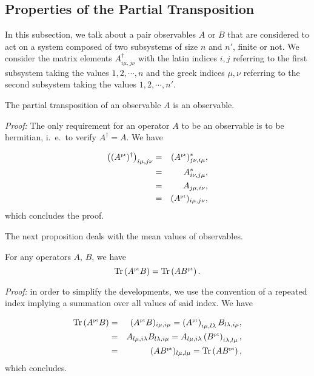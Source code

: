 \subsection{Properties of the Partial Transposition}

In this subsection, we talk about a pair observables $A$ or $B$ that are considered to act on a system composed of two subsystems of size $n$ and $n'$, finite or not. We consider the matrix elements $A^\dagger_{i\mu,j\nu}$ with the latin indices $i,j$ referring to the first subsystem taking the values $1,2,\cdots,n$ and the greek indices $\mu,\nu$ referring to the second subsystem taking the values $1,2,\cdots,n'$.

\setcounter{prop}{0}

\begin{prop} \label{prop-herm}
  The partial transposition of an observable $A$ is an observable.
\end{prop}

\emph{Proof: } The only requirement for an operator $A$ to be an observable is to be hermitian, i.~e.~to verify $A^\dagger=A$. We have

\begin{eqnarray}
  \left((A^{\mbox{\tiny \textup{pt}}})^\dagger \right)_{i\mu,j\nu}  &=& (A^{\mbox{\tiny \textup{pt}}})_{j\nu,i\mu}^* ,\\
  &=& A_{i\nu,j\mu}^* ,\\
  &=& A_{j\mu,i\nu} ,\\
  &=& (A^{\mbox{\tiny \textup{pt}}})_{i\mu,j\nu},
\end{eqnarray}
which concludes the proof.

The next proposition deals with the mean values of observables.

\begin{prop} \label{prop-mean}
  For any operators $A$, $B$, we have
  \[ \mbox{\textup{Tr}}\left( A^{\mbox{\tiny \textup{pt}}} B \right) = \mbox{\textup{Tr}}\left(  A B^{\mbox{\tiny \textup{pt}}} \right).\]
\end{prop}

\emph{Proof: } in order to simplify the developments, we use the convention of a repeated index implying a summation over all values of said index. We have

\begin{eqnarray}
  \mbox{\textup{Tr}}\left( A^{\mbox{\tiny \textup{pt}}} B \right) &=& (A^{\mbox{\tiny \textup{pt}}} B)_{i\mu,i\mu} = \left( A^{\mbox{\tiny \textup{pt}}}\right)_{i\mu,l\lambda} B_{l\lambda,i\mu} ,\\
  &=&  A_{l\mu,i\lambda} B_{l\lambda,i\mu} =  A_{l\mu,i\lambda} \left(B^{\mbox{\tiny \textup{pt}}} \right)_{i\lambda,l\mu}, \\
  &=&   (A B^{\mbox{\tiny \textup{pt}}} )_{l\mu,l\mu} =  \mbox{\textup{Tr}}\left( A B^{\mbox{\tiny \textup{pt}}} \right) ,
\end{eqnarray}
which concludes.

